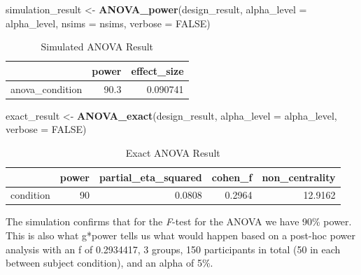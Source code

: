 \documentclass[]{book}
\newenvironment{Shaded}{\begin{snugshade}}{\end{snugshade}}
\newcommand{\DataTypeTok}[1]{\textcolor[rgb]{0.13,0.29,0.53}{#1}}
\newcommand{\KeywordTok}[1]{\textcolor[rgb]{0.13,0.29,0.53}{\textbf{#1}}}
\newcommand{\NormalTok}[1]{#1}
\newcommand{\OtherTok}[1]{\textcolor[rgb]{0.56,0.35,0.01}{#1}}
\newcommand{\StringTok}[1]{\textcolor[rgb]{0.31,0.60,0.02}{#1}}
\begin{document}
\begin{Shaded}
\begin{Highlighting}[]
\NormalTok{simulation_result <-}\StringTok{ }\KeywordTok{ANOVA_power}\NormalTok{(design_result, }
                                 \DataTypeTok{alpha_level =}\NormalTok{ alpha_level, }
                                 \DataTypeTok{nsims =}\NormalTok{ nsims,}
                                 \DataTypeTok{verbose =} \OtherTok{FALSE}\NormalTok{)}
\end{Highlighting}
\end{Shaded}

\begin{table}[t]

\caption{\label{tab:unnamed-chunk-41}Simulated ANOVA Result}
\centering
\begin{tabular}{l|r|r}
\hline
  & power & effect\_size\\
\hline
anova\_condition & 90.3 & 0.090741\\
\hline
\end{tabular}
\end{table}

\begin{Shaded}
\begin{Highlighting}[]
\NormalTok{exact_result <-}\StringTok{ }\KeywordTok{ANOVA_exact}\NormalTok{(design_result,}
                            \DataTypeTok{alpha_level =}\NormalTok{ alpha_level,}
                            \DataTypeTok{verbose =} \OtherTok{FALSE}\NormalTok{)}
\end{Highlighting}
\end{Shaded}

\begin{table}[t]

\caption{\label{tab:unnamed-chunk-43}Exact ANOVA Result}
\centering
\begin{tabular}{l|r|r|r|r}
\hline
  & power & partial\_eta\_squared & cohen\_f & non\_centrality\\
\hline
condition & 90 & 0.0808 & 0.2964 & 12.9162\\
\hline
\end{tabular}
\end{table}

The simulation confirms that for the \emph{F}-test for the ANOVA we have 90\% power. This is also what g*power tells us what would happen based on a post-hoc power analysis with an f of 0.2934417, 3 groups, 150 participants in total (50 in each between subject condition), and an alpha of 5\%.
\end{document}
